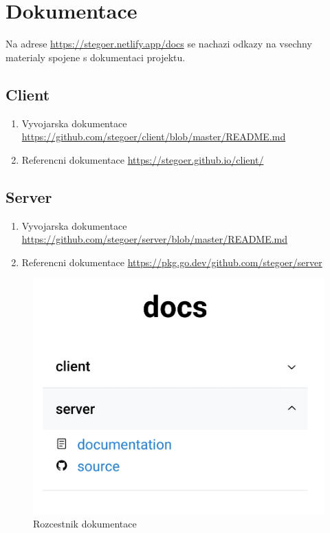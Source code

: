 
\section{Dokumentace}\label{sec:dokumentace}

Na adrese \url{https://stegoer.netlify.app/docs} se nachazi odkazy na vsechny
materialy spojene s dokumentaci projektu.

\subsection{Client}\label{subsec:doc-client}
\begin{enumerate}
    \item Vyvojarska dokumentace \url{https://github.com/stegoer/client/blob/master/README.md}
    \item Referencni dokumentace \url{https://stegoer.github.io/client/}
\end{enumerate}

\subsection{Server}\label{subsec:doc-server}
\begin{enumerate}
    \item Vyvojarska dokumentace \url{https://github.com/stegoer/server/blob/master/README.md}
    \item Referencni dokumentace \url{https://pkg.go.dev/github.com/stegoer/server}
\end{enumerate}

\begin{figure}
    \centering
    \includegraphics[scale=0.3]{assets/images/docs-page}
    \caption{Rozcestnik dokumentace}\label{fig:rozcestnik-dokumentace}
\end{figure}

